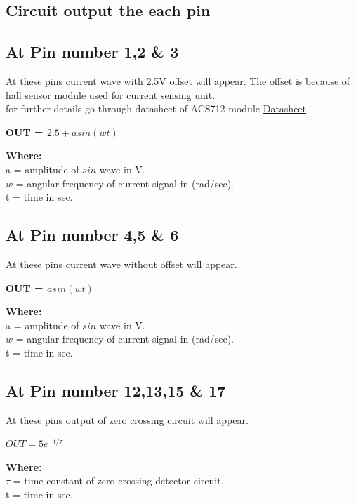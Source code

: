 \documentclass[a4paper,12pt,oneside]{book}
\begin{document}
\begin{appendices}
\section{Circuit output the each pin}
\subsection*{At Pin number 1,2 \& 3}
At these pins current wave with 2.5V offset will appear. The offset is because of hall sensor module used for current sensing unit.\\
for further details go through datasheet of ACS712 module \href{./datasheet/ACS712-Datasheet.pdf}{Datasheet}
	\begin{center}
		\textbf{OUT = $2.5 + asin(wt)$}
	\end{center}
	\begin{flushleft}
		\textbf{Where:}\\
			a = amplitude of $sin$ wave in V.\\
			$w$ = angular frequency of current signal in (rad/sec).\\
			t = time in sec.\\
	\end{flushleft}
	
\subsection*{At Pin number 4,5 \& 6}
At these pins current wave without offset will appear.\\
\begin{center}
	\textbf{OUT = $asin(wt)$}
\end{center}
\begin{flushleft}
	\textbf{Where:}\\
	a = amplitude of $sin$ wave in V.\\
	$w$ = angular frequency of current signal in (rad/sec).\\
	t = time in sec.\\
\end{flushleft}

\subsection*{At Pin number 12,13,15 \& 17}
At these pins output of zero crossing circuit will appear.\\
\begin{center}
	\label{96}
	\textbf{$OUT = 5e^{-t/\tau}$}
\end{center}
\begin{flushleft}
	\textbf{Where:}\\
	$\tau$ = time constant of zero crossing detector circuit.\\
	t = time in sec.\\
\end{flushleft}

\end{appendices}
\end{document}

